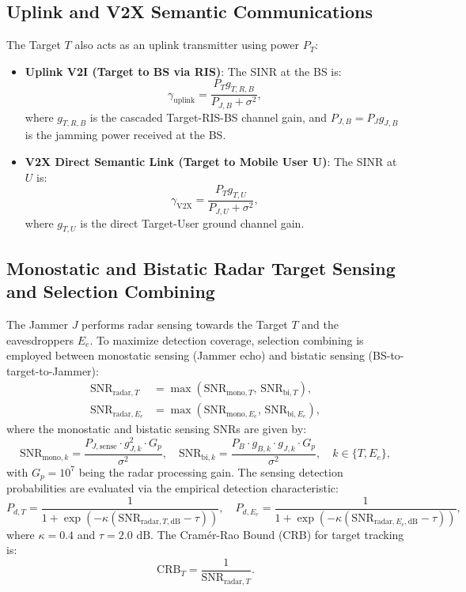 \documentclass[journal,onecolumn]{IEEEtran}
\begin{document}
\subsection{Uplink and V2X Semantic Communications}
The Target $T$ also acts as an uplink transmitter using power $P_T$:
\begin{itemize}
    \item \textbf{Uplink V2I (Target to BS via RIS)}: The SINR at the BS is:
    \begin{equation}
        \gamma_{\text{uplink}} = \frac{P_T g_{T, R, B}}{P_{J, B} + \sigma^2},
    \end{equation}
    where $g_{T, R, B}$ is the cascaded Target-RIS-BS channel gain, and $P_{J, B} = P_J g_{J, B}$ is the jamming power received at the BS.
    \item \textbf{V2X Direct Semantic Link (Target to Mobile User U)}: The SINR at $U$ is:
    \begin{equation}
        \gamma_{\text{V2X}} = \frac{P_T g_{T, U}}{P_{J, U} + \sigma^2},
    \end{equation}
    where $g_{T, U}$ is the direct Target-User ground channel gain.
\end{itemize}

\subsection{Monostatic and Bistatic Radar Target Sensing and Selection Combining}
The Jammer $J$ performs radar sensing towards the Target $T$ and the eavesdroppers $E_e$. To maximize detection coverage, selection combining is employed between monostatic sensing (Jammer echo) and bistatic sensing (BS-to-target-to-Jammer):
\begin{align}
    \text{SNR}_{\text{radar}, T} &= \max\left( \text{SNR}_{\text{mono}, T},\, \text{SNR}_{\text{bi}, T} \right), \\
    \text{SNR}_{\text{radar}, E_e} &= \max\left( \text{SNR}_{\text{mono}, E_e},\, \text{SNR}_{\text{bi}, E_e} \right),
\end{align}
where the monostatic and bistatic sensing SNRs are given by:
\begin{equation}
    \text{SNR}_{\text{mono}, k} = \frac{P_{J, \text{sense}} \cdot g_{J,k}^2 \cdot G_p}{\sigma^2}, \quad
    \text{SNR}_{\text{bi}, k} = \frac{P_B \cdot g_{B, k} \cdot g_{J, k} \cdot G_p}{\sigma^2}, \quad k \in \{T, E_e\},
\end{equation}
with $G_p = 10^7$ being the radar processing gain. The sensing detection probabilities are evaluated via the empirical detection characteristic:
\begin{equation}
    P_{d, T} = \frac{1}{1 + \exp\left( -\kappa (\text{SNR}_{\text{radar}, T, \text{dB}} - \tau) \right)}, \quad
    P_{d, E_e} = \frac{1}{1 + \exp\left( -\kappa (\text{SNR}_{\text{radar}, E_e, \text{dB}} - \tau) \right)},
\end{equation}
where $\kappa = 0.4$ and $\tau = 2.0\text{ dB}$. The Cram\'{e}r-Rao Bound (CRB) for target tracking is:
\begin{equation}
    \text{CRB}_T = \frac{1}{\text{SNR}_{\text{radar}, T}}.
\end{equation}
\end{document}
